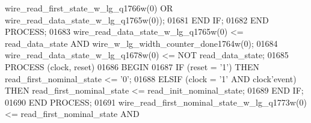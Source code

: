 \begin{DoxyCode}
{{      wire_read_first_state_w_lg_q1766w}\textcolor{vhdlchar}{(}\textcolor{vhdllogic}{}\textcolor{vhdllogic}{0}\textcolor{vhdlchar}{)} \textcolor{keywordflow}{OR} \textcolor{vhdlchar}{wire_read_data_state_w_lg_q1765w}\textcolor{vhdlchar}{(}\textcolor{vhdllogic}{}\textcolor{vhdllogic}{0}\textcolor{vhdlchar}{)}\textcolor{vhdlchar}{)};
01681         \textcolor{keywordflow}{END} \textcolor{keywordflow}{IF};
01682     \textcolor{keywordflow}{END} \textcolor{keywordflow}{PROCESS};
01683     \textcolor{vhdlchar}{wire_read_data_state_w_lg_q1765w}\textcolor{vhdlchar}{(}\textcolor{vhdllogic}{}\textcolor{vhdllogic}{0}\textcolor{vhdlchar}{)} \textcolor{vhdlchar}{<=} \textcolor{vhdlchar}{read_data_state} \textcolor{keywordflow}{AND} \textcolor{vhdlchar}{
      wire_w_lg_width_counter_done1764w}\textcolor{vhdlchar}{(}\textcolor{vhdllogic}{}\textcolor{vhdllogic}{0}\textcolor{vhdlchar}{)};
01684     \textcolor{vhdlchar}{wire_read_data_state_w_lg_q1678w}\textcolor{vhdlchar}{(}\textcolor{vhdllogic}{}\textcolor{vhdllogic}{0}\textcolor{vhdlchar}{)} \textcolor{vhdlchar}{<=} \textcolor{keywordflow}{NOT} \textcolor{vhdlchar}{read_data_state};
01685     \textcolor{keywordflow}{PROCESS} (clock, reset)
01686 \textcolor{vhdlkeyword}{    BEGIN}
01687         \textcolor{keywordflow}{IF} \textcolor{vhdlchar}{(}\textcolor{vhdlchar}{reset} \textcolor{vhdlchar}{=} \textcolor{vhdlchar}{'}\textcolor{vhdllogic}{}\textcolor{vhdllogic}{1}\textcolor{vhdlchar}{'}\textcolor{vhdlchar}{)} \textcolor{keywordflow}{THEN} \textcolor{vhdlchar}{read_first_nominal_state} \textcolor{vhdlchar}{<=} \textcolor{vhdlchar}{'}\textcolor{vhdllogic}{}\textcolor{vhdllogic}{0}\textcolor{vhdlchar}{'};
01688         \textcolor{keywordflow}{ELSIF} \textcolor{vhdlchar}{(}\textcolor{vhdlchar}{clock} \textcolor{vhdlchar}{=} \textcolor{vhdlchar}{'}\textcolor{vhdllogic}{}\textcolor{vhdllogic}{1}\textcolor{vhdlchar}{'} \textcolor{keywordflow}{AND} \textcolor{vhdlchar}{clock}\textcolor{vhdlchar}{'}\textcolor{vhdlkeyword}{event}\textcolor{vhdlchar}{)} \textcolor{keywordflow}{THEN} \textcolor{vhdlchar}{read_first_nominal_state} \textcolor{vhdlchar}{<=} \textcolor{vhdlchar}{
      read_init_nominal_state};
01689         \textcolor{keywordflow}{END} \textcolor{keywordflow}{IF};
01690     \textcolor{keywordflow}{END} \textcolor{keywordflow}{PROCESS};
01691     \textcolor{vhdlchar}{wire_read_first_nominal_state_w_lg_q1773w}\textcolor{vhdlchar}{(}\textcolor{vhdllogic}{}\textcolor{vhdllogic}{0}\textcolor{vhdlchar}{)} \textcolor{vhdlchar}{<=} \textcolor{vhdlchar}{read_first_nominal_state} \textcolor{keywordflow}{AND} \textcolor{vhdlchar}{
}}
\end{DoxyCode}

